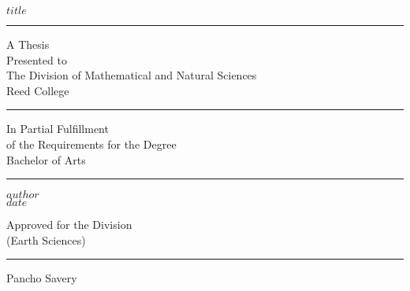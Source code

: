 \begin{center}
    $title$
    \vfil
    \hrule
    \vfil
    A Thesis \\
    Presented to \\
    The Division of Mathematical and Natural Sciences \\
    Reed College
    \vfil
    \hrule
    \vfil
    In Partial Fulfillment \\
    of the Requirements for the Degree \\
    Bachelor of Arts
    \vfil
    \hrule
    \vfil
    $author$ \\
    $date$
    
    \cleardoublepage
    
    \vfil
    Approved for the Division \\
    (Earth Sciences)
    
    \bigskip
    \bigskip
    \bigskip
    \hrule
    
    \medskip
    Pancho Savery
    \vfil
\end{center}
